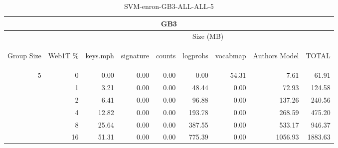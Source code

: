 \begin{center}
\begin{table}[htbp] 
 \begin{center}
\begin{tabular}{ | r | r | r | r | r | r | r | r | r |}
\hline
\multicolumn{9}{|c|}{GB3}\\
\hline
 & & \multicolumn{7}{|c|}{Size (MB)}\\ \cline{3-9}
\begin{sideways}Group Size\end{sideways} & \begin{sideways}Web1T \% \end{sideways} & \begin{sideways}keys.mph\end{sideways} & \begin{sideways}signature\end{sideways} & \begin{sideways}counts\end{sideways} & \begin{sideways}logprobs\end{sideways} & \begin{sideways}vocabmap\end{sideways} & \begin{sideways}Authors Model \end{sideways} & \begin{sideways}TOTAL\end{sideways}\\
\hline
\multirow{5}{*}{5}
 & 0 & 0.00 & 0.00 & 0.00 & 0.00 & 54.31 & 7.61 & 61.91\\ \cline{2-9}
 & 1 & 3.21 & 0.00 & 0.00 & 48.44 & 0.00 & 72.93 & 124.58\\ \cline{2-9}
 & 2 & 6.41 & 0.00 & 0.00 & 96.88 & 0.00 & 137.26 & 240.56\\ \cline{2-9}
 & 4 & 12.82 & 0.00 & 0.00 & 193.78 & 0.00 & 268.59 & 475.20\\ \cline{2-9}
 & 8 & 25.64 & 0.00 & 0.00 & 387.55 & 0.00 & 533.17 & 946.37\\ \cline{2-9}
 & 16 & 51.31 & 0.00 & 0.00 & 775.39 & 0.00 & 1056.93 & 1883.63\\ \cline{2-9}
\hline
\end{tabular}
\caption{SVM-enron-GB3-ALL-ALL-5}
\label{table:SVM-enron-GB3-ALL-ALL-5}
\end{center}
 \end{table}
\end{center}

